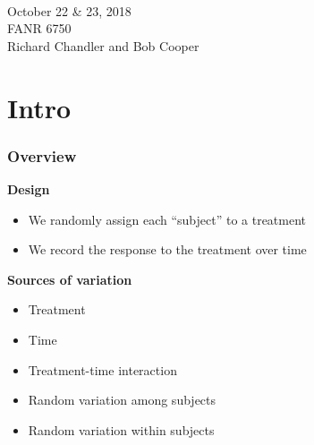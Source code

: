 \documentclass[color=usenames,dvipsnames]{beamer}\usepackage[]{graphicx}\usepackage[]{color}
\begin{document}



\begin{frame}[plain]
  \huge %
  \centering \par
  {\color{RoyalBlue}{Lab 10 -- Repeated Measures}} \\
  \vspace{1cm}
  \Large
  October 22 \& 23, 2018 \\
  FANR 6750 \\
  \vfill
  \large
  Richard Chandler and Bob Cooper
\end{frame}


\section{Intro}


\begin{frame}%
  \frametitle{Overview}
  \large
  {\bf Design}
  \begin{itemize}
    \item We randomly assign each ``subject'' to a treatment
    \item We record the response to the treatment over time
  \end{itemize}
  \pause
  \vspace{0.5cm}
  {\bf Sources of variation}
  \begin{itemize}
    \item Treatment
    \item Time
    \item Treatment-time interaction
    \item Random variation among subjects
    \item Random variation within subjects
  \end{itemize}
\end{frame}
\end{document}
